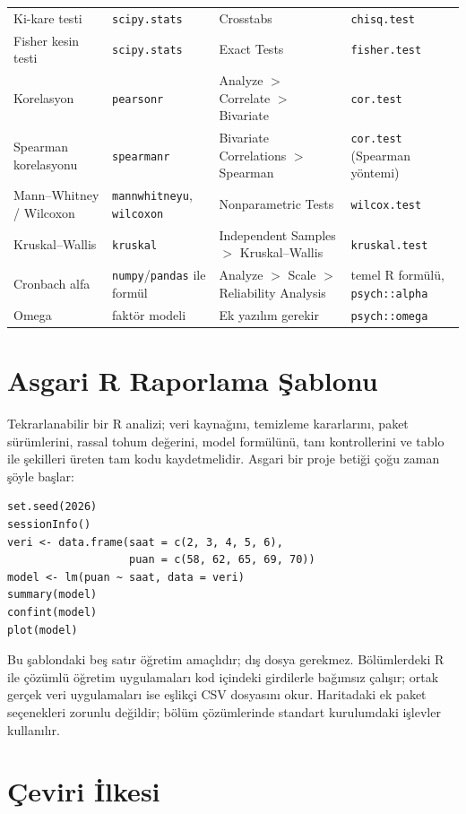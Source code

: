 \begin{table}[H]
\begin{tabularx}{\textwidth}{@{}>{\raggedright\arraybackslash}p{}>{\raggedright\arraybackslash}X>{\raggedright\arraybackslash}X>{\raggedright\arraybackslash}X@{}}
Ki-kare testi & \texttt{scipy.stats} & Crosstabs & \texttt{chisq.test} \\
Fisher kesin testi & \texttt{scipy.stats} & Exact Tests & \texttt{fisher.test} \\
Korelasyon & \texttt{pearsonr} & Analyze $>$ Correlate $>$ Bivariate & \texttt{cor.test} \\
Spearman korelasyonu & \texttt{spearmanr} & Bivariate Correlations $>$ Spearman & \texttt{cor.test} (Spearman yöntemi) \\
Mann--Whitney / Wilcoxon & \texttt{mannwhitneyu}, \texttt{wilcoxon} & Nonparametric Tests & \texttt{wilcox.test} \\
Kruskal--Wallis & \texttt{kruskal} & Independent Samples $>$ Kruskal--Wallis & \texttt{kruskal.test} \\
Cronbach alfa & \texttt{numpy}/\texttt{pandas} ile formül & Analyze $>$ Scale $>$ Reliability Analysis & temel R formülü, \texttt{psych::alpha} \\
Omega & faktör modeli & Ek yazılım gerekir & \texttt{psych::omega} \\
\bottomrule
\end{tabularx}
\end{table}

\section*{Asgari R Raporlama Şablonu}

Tekrarlanabilir bir R analizi; veri kaynağını, temizleme kararlarını, paket sürümlerini, rassal tohum değerini, model formülünü, tanı kontrollerini ve tablo ile şekilleri üreten tam kodu kaydetmelidir. Asgari bir proje betiği çoğu zaman şöyle başlar:

\begin{lstlisting}[style=prismR]
set.seed(2026)
sessionInfo()
veri <- data.frame(saat = c(2, 3, 4, 5, 6),
                   puan = c(58, 62, 65, 69, 70))
model <- lm(puan ~ saat, data = veri)
summary(model)
confint(model)
plot(model)
\end{lstlisting}

Bu şablondaki beş satır öğretim amaçlıdır; dış dosya gerekmez. Bölümlerdeki
R ile çözümlü öğretim uygulamaları kod içindeki girdilerle bağımsız çalışır; ortak gerçek veri uygulamaları ise eşlikçi CSV dosyasını okur. Haritadaki ek paket seçenekleri zorunlu değildir; bölüm çözümlerinde standart kurulumdaki işlevler kullanılır.

\section*{Çeviri İlkesi}

